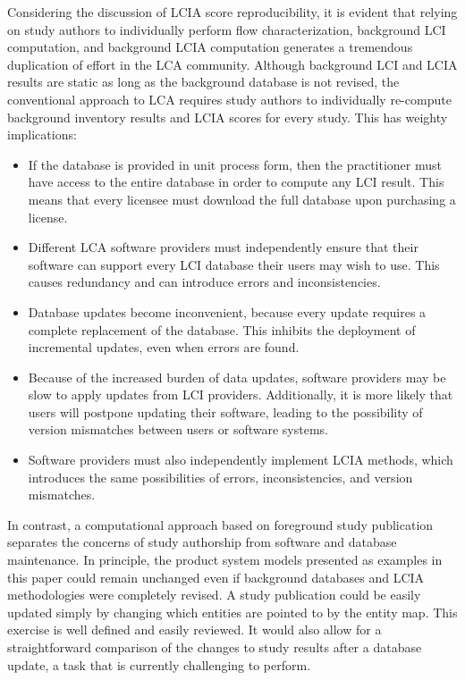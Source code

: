 Considering the discussion of LCIA score reproducibility, it is evident that relying on study authors to individually perform flow characterization, background LCI computation, and background LCIA computation generates a tremendous duplication of effort in the LCA community.  Although background LCI and LCIA results are static as long as the background database is not revised, the conventional approach to LCA requires study authors to individually re-compute background inventory results and LCIA scores for every study.  This has weighty implications:

\begin{itemize}
\item If the database is provided in unit process form, then the practitioner must have access to the entire database in order to compute any LCI result.  This means that every licensee must download the full database upon purchasing a license.
\item Different LCA software providers must independently ensure that their software can support every LCI database their users may wish to use.  This %
  causes redundancy and can introduce errors and inconsistencies.
\item Database updates become inconvenient, because every update requires a complete replacement of the database. This inhibits the deployment of incremental updates, even when errors are found.
\item Because of the increased burden of data updates, software providers may be slow to apply updates from LCI providers.  Additionally, it is more likely that users will postpone updating their software, leading to the possibility of version mismatches between users or software systems.
\item Software providers must also independently implement LCIA methods, which introduces the same possibilities of errors, inconsistencies, and version mismatches.
\end{itemize}

In contrast, a computational approach based on foreground study publication separates the concerns of study authorship from software and database maintenance.  In principle, the product system models presented as examples in this paper could remain unchanged even if background databases and LCIA methodologies were completely revised.  A study publication could be easily updated simply by changing which entities are pointed to by the entity map.  This exercise is well defined and easily reviewed.  It would also allow for a straightforward comparison of the changes to study results after a database update, a task that is currently challenging to perform.

